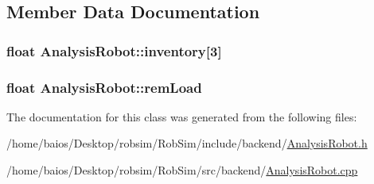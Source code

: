 \subsection{Member Data Documentation}
\hypertarget{class_analysis_robot_a1cc3b0734f5e183c01aedf9fb563e9bb}{
\subsubsection[{inventory}]{\setlength{\rightskip}{0pt plus 5cm}float Analysis\-Robot\-::inventory\mbox{[}3\mbox{]}}}\label{class_analysis_robot_a1cc3b0734f5e183c01aedf9fb563e9bb}
\hypertarget{class_analysis_robot_a14ed4ba869e1dedc9100c1ce357b235d}{
\subsubsection[{rem\-Load}]{\setlength{\rightskip}{0pt plus 5cm}float Analysis\-Robot\-::rem\-Load}}\label{class_analysis_robot_a14ed4ba869e1dedc9100c1ce357b235d}


The documentation for this class was generated from the following files\-:\begin{DoxyCompactItemize}
\item 
/home/baios/\-Desktop/robsim/\-Rob\-Sim/include/backend/\hyperlink{_analysis_robot_8h}{Analysis\-Robot.\-h}\item 
/home/baios/\-Desktop/robsim/\-Rob\-Sim/src/backend/\hyperlink{_analysis_robot_8cpp}{Analysis\-Robot.\-cpp}\end{DoxyCompactItemize}

